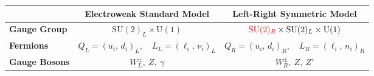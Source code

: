 \begin{tabular}{lcc}
    \toprule
    & \textbf{Electroweak Standard Model} 
    & \textbf{Left-Right Symmetric Model} \\ 
    \midrule
    \textbf{Gauge Group} 
      & \(\mathrm{SU}(2)_{L} \times \mathrm{U}(1)\) 
      & \(\textcolor{red}{\mathrm{SU}(2)_{R}} \times \mathrm{SU}(2)_{L} \times \mathrm{U}(1)\) \\[6pt]
    \textbf{Fermions} 
      & \(Q_{L} = (u_i,\,d_i)_{L},\quad L_{L} = (\ell_i,\,\nu_i)_{L}\) 
      & \(Q_{R} = (u_i,\,d_i)_{R},\quad L_{R} = (\ell_i,\,n_i)_{R}\) \\[6pt]
    \textbf{Gauge Bosons} 
      & \(W_{L}^{\pm},\ Z,\ \gamma\) 
      & \(W_{R}^{\pm},\ Z,\ Z'\) \\ 
    \bottomrule
  \end{tabular}